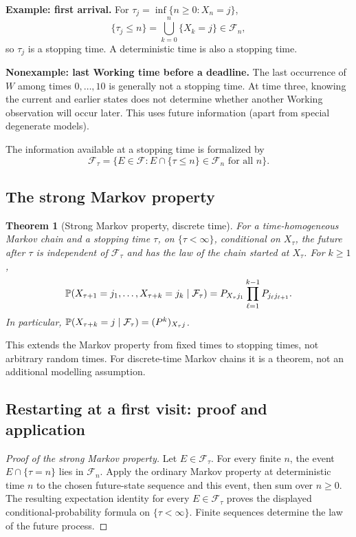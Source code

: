 \documentclass[11pt]{article}
\newtheorem{theorem}[definition]{Theorem}
\theoremstyle{remark}\newtheorem{remark}[definition]{Remark}
\begin{document}
\textbf{Example: first arrival.} For $\tau_j=\inf\{n\geq0:X_n=j\}$,
\[
\{\tau_j\leq n\}=\bigcup_{k=0}^n\{X_k=j\}\in\mathcal F_n,
\]
so $\tau_j$ is a stopping time. A deterministic time is also a stopping time.

\textbf{Nonexample: last Working time before a deadline.} The last occurrence of $W$ among times $0,\ldots,10$ is generally not a stopping time. At time three, knowing the current and earlier states does not determine whether another Working observation will occur later. This uses future information (apart from special degenerate models).

The information available at a stopping time is formalized by
\[
\mathcal F_\tau=\{E\in\mathcal F:E\cap\{\tau\leq n\}\in\mathcal F_n\text{ for all }n\}.
\]

\subsection{The strong Markov property}
\begin{theorem}[Strong Markov property, discrete time]
For a time-homogeneous Markov chain and a stopping time $\tau$, on $\{\tau<\infty\}$, conditional on $X_\tau$, the future after $\tau$ is independent of $\mathcal F_\tau$ and has the law of the chain started at $X_\tau$. For $k\geq1$,
\[
\mathbb P(X_{\tau+1}=j_1,\ldots,X_{\tau+k}=j_k\mid\mathcal F_\tau)
=P_{X_\tau j_1}\prod_{\ell=1}^{k-1}P_{j_\ell j_{\ell+1}}.
\]
In particular, $\mathbb P(X_{\tau+k}=j\mid\mathcal F_\tau)=(P^k)_{X_\tau j}$.
\end{theorem}
This extends the Markov property from fixed times to stopping times, not arbitrary random times. For discrete-time Markov chains it is a theorem, not an additional modelling assumption.

\clearpage
\subsection{Restarting at a first visit: proof and application}
\begin{proof}[Proof of the strong Markov property]
Let $E\in\mathcal F_\tau$. For every finite $n$, the event $E\cap\{\tau=n\}$ lies in $\mathcal F_n$. Apply the ordinary Markov property at deterministic time $n$ to the chosen future-state sequence and this event, then sum over $n\geq0$. The resulting expectation identity for every $E\in\mathcal F_\tau$ proves the displayed conditional-probability formula on $\{\tau<\infty\}$. Finite sequences determine the law of the future process.
\end{proof}
\end{document}
